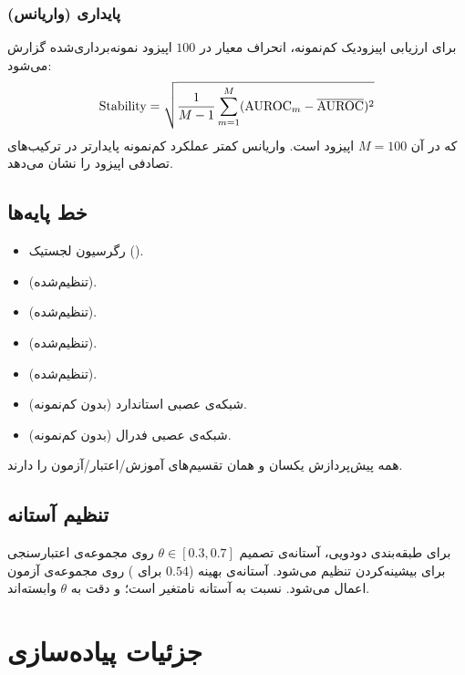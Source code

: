 \subsubsection{پایداری (واریانس)}

برای ارزیابی اپیزودیک کم‌نمونه، انحراف معیار  در $100$ اپیزود نمونه‌برداری‌شده گزارش می‌شود:
\begin{equation}
\text{Stability} = \sqrt{\frac{1}{M-1}\sum_{m=1}^{M}(\text{AUROC}_m - \overline{\text{AUROC}})^2}
\end{equation}
که در آن $M = 100$ اپیزود است. واریانس کمتر عملکرد کم‌نمونه پایدارتر در ترکیب‌های تصادفی اپیزود را نشان می‌دهد.

\subsection{خط پایه‌ها}

\begin{itemize}
\item رگرسیون لجستیک ().
\item {} (تنظیم‌شده).
\item {} (تنظیم‌شده).
\item {} (تنظیم‌شده).
\item {} (تنظیم‌شده).
\item شبکه‌ی عصبی استاندارد (بدون کم‌نمونه).
\item شبکه‌ی عصبی فدرال (بدون کم‌نمونه).
\end{itemize}
همه پیش‌پردازش یکسان و همان تقسیم‌های آموزش/اعتبار/آزمون را دارند.

\subsection{تنظیم آستانه}

برای طبقه‌بندی دودویی، آستانه‌ی تصمیم $\theta \in [0.3, 0.7]$ روی مجموعه‌ی اعتبارسنجی برای بیشینه‌کردن  تنظیم می‌شود. آستانه‌ی بهینه ($0.54$ برای ) روی مجموعه‌ی آزمون اعمال می‌شود.  نسبت به آستانه نامتغیر است؛  و دقت به $\theta$ وابسته‌اند.

\section{جزئیات پیاده‌سازی}

